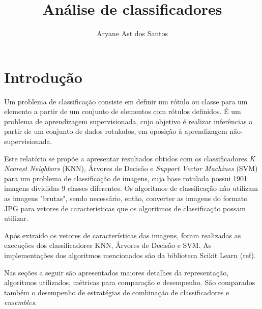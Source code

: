 \documentclass[conference]{IEEEtran}
\begin{document}
\title{Análise de classificadores}
\author{Aryane Ast dos Santos}



\author
{
}

\maketitle






%


\section{Introdução}

Um problema de classificação consiste em definir um rótulo ou classe para um
elemento a partir de um conjunto de elementos com rótulos definidos. É um
problema de aprendizagem supervisionada, cujo objetivo é realizar inferências a
partir de um conjunto de dados rotulados, em oposição à aprendizagem
não-supervisionada.

Este relatório se propõe a apresentar resultados obtidos com os classificadores
\emph{K Nearest Neighbors} (KNN), Árvores de Decisão e \emph{Support Vector
Machines} (SVM) para um problema de classificação de imagens, cuja base
rotulada possui 1901 imagens divididas 9 classes diferentes.  Os algoritmos de
classificação não utilizam as imagens "brutas", sendo necessário, então,
converter as imagens do formato JPG para vetores de características que os
algoritmos de classificação possam utilizar.

Após extraído os vetores de características das imagens, foram realizadas as
execuções dos classificadores KNN, Árvores de Decisão e SVM. As implementações
dos algoritmos mencionados são da biblioteca Scikit Learn (ref).

Nas seções a seguir são apresentados maiores detalhes da representação,
algoritmos utilizados, métricas para comparação e desempenho.  São comparados
também o desempenho de estratégias de combinação de classificadores e
\emph{ensembles}.
\end{document}
